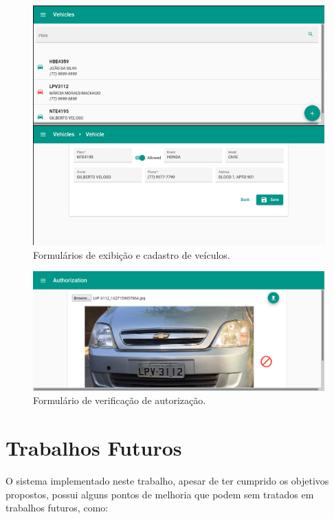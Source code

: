 \documentclass[12pt]{article}
\begin{document}
\begin{figure}[ht]
	\centering
	\includegraphics[width=1\textwidth]{vehicles-forms.png}
	\caption{Formulários de exibição e cadastro de veículos.}
	\label{fig:vehicles-forms}
\end{figure}

\begin{figure}[ht]
	\centering
	\includegraphics[width=1\textwidth]{check-form.png}
	\caption{Formulário de verificação de autorização.}
	\label{fig:check-form}
\end{figure}

\section{Trabalhos Futuros}

O sistema implementado neste trabalho, apesar de ter cumprido os objetivos propostos, possui alguns pontos de melhoria que podem sem tratados em trabalhos futuros, como:
\end{document}
